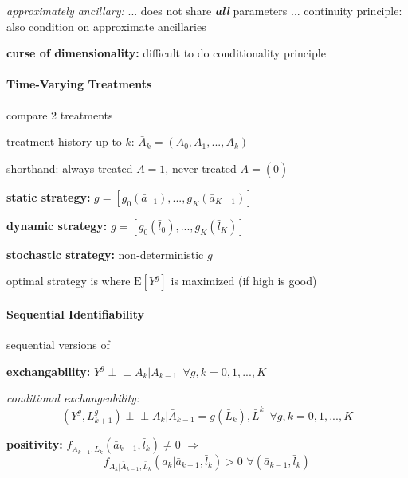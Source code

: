 \documentclass[8pt,twoside]{extarticle}
\newcommand{\indep}{\perp \!\!\! \perp}
\begin{document}
\begin{multicols}{2}
\textit{approximately ancillary:}  ... does not share \textit{\textbf{all}} parameters ... 
continuity principle: also condition on approximate ancillaries

 \textbf{curse of dimensionality:} difficult to do conditionality principle


\vspace{1.5em}

 \colorbox{lightgray!20!white}{\begin{minipage}{28em}



\paragraph{Time-Varying Treatments} compare 2 treatments

 treatment history up to $k$: $\bar{A}_k=(A_0, A_1, ..., A_k)$

 shorthand: always treated $\bar{A} = \bar{1}$, never treated $\bar{A} = \left(\bar{0}\right)$

 \textbf{static strategy:} $g=\left[g_0(\bar{a}_{-1}), ..., g_K(\bar{a}_{K-1})\right]$

 \textbf{dynamic strategy:} $g=\left[g_0(\bar{l}_0), ..., g_K(\bar{l}_K)\right]$

 \textbf{stochastic strategy:} non-deterministic $g$


 optimal strategy is where $\mathrm{E}\left[Y^g\right]$ is maximized (if high is good)

\end{minipage}}

\vspace{1.5em}

 \colorbox{lightgray!20!white}{\begin{minipage}{28em}


\paragraph{Sequential Identifiability} sequential versions of

 \textbf{exchangability:}
$Y^g \indep A_k| \bar{A}_{k-1} \,\,\, \forall g, k=0,1,...,K$

\textit{conditional exchangeability:}
$$\left(Y^g, L^g_{k+1}\right) \indep A_k| \bar{A}_{k-1} {=} g\left(\bar{L}_k\right), \bar{L}^k \,\,\, \forall g, k=0,1,...,K$$

 \textbf{positivity:} $f_{\bar{A}_{k-1},\bar{L}_k}(\bar{a}_{k-1},\bar{l}_k)\neq 0 \,\, \Rightarrow$
$$ f_{A_k|\bar{A}_{k-1},\bar{L}_k}(a_k|\bar{a}_{k-1},\bar{l}_k)>0 \,\, \forall \left(\bar{a}_{k-1},\bar{l}_k\right)$$


\end{minipage}}
\end{multicols}
\end{document}
